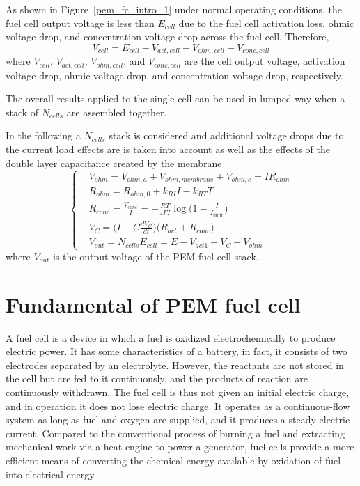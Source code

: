 \documentclass[12pt,a4paper]{scrartcl}
\begin{document}
\begin{onehalfspace}
As shown in Figure~\ref{pem_fc_intro_1} under normal operating conditions, the fuel cell output voltage is less than $E_{cell}$ due to the fuel cell activation loss, ohmic voltage drop, and concentration voltage drop across the fuel cell. Therefore,
\begin{equation}
	V_{cell} = E_{cell} - V_{act,cell} - V_{ohm,cell}-V_{conc,cell}
\end{equation}
where $V_{cell}$, $V_{act,cell}$, $V_{ohm,cell}$, and $V_{conc,cell}$ are the cell output voltage, activation voltage drop, ohmic voltage drop, and concentration voltage drop, respectively.

The overall results applied to the single cell can be used in lumped way when a stack of $N_{cells}$ are assembled together. 

In the following a $N_{cells}$ stack is considered and additional voltage drops due to the current load effects are is taken into account as well as the effects of the double layer capacitance created by the membrane
\begin{equation}\label{voltage_drop_equations}
	\left\lbrace \begin{aligned}
		&	V_{ohm} = V_{ohm,a} + V_{ohm,membrane} + V_{ohm,c} = IR_{ohm} \\[8pt]
		&	R_{ohm} = R_{ohm,0} + k_{RI}I - k_{RT}T \\[8pt]
		&	R_{conc}=\frac{V_{conc}}{I}=-\frac{RT}{zFI}\log\Big(1-\frac{I}{I_{\text{limit}}}\Big) \\[8pt]
		&	V_{C}=\Big(I-C\frac{dV_C}{dt}\Big)\big(R_{act}+R_{conc}\big) \\[8pt]
		&	V_{out} = N_{cells}E_{cell} = E - V_{act1} - V_C - V_{ohm}
	\end{aligned}\right. 
\end{equation}
where $V_{out}$ is the output voltage of the PEM fuel cell stack.

\section{Fundamental of PEM fuel cell}\label{fundamental}
A fuel cell is a device in which a fuel is oxidized electrochemically to produce electric power. It has some characteristics of a battery, in fact, it consists of two electrodes separated by an electrolyte. However, the reactants are not stored in the cell but are fed to it continuously, and the products of reaction are continuously withdrawn. The fuel cell is thus not given an initial electric charge, and in operation it does not lose electric charge. It operates as a continuous-flow system as long as fuel and oxygen are supplied, and it produces a steady electric current. Compared to the conventional process of burning a fuel and extracting mechanical work via a heat engine to power a generator, fuel cells provide a more efficient means of converting the chemical energy available by oxidation of fuel into electrical energy.


\end{onehalfspace}
\end{document}
